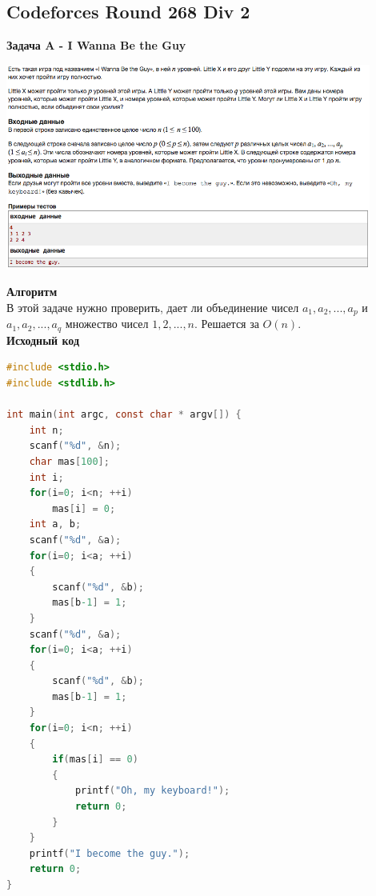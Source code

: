 \documentclass[a4paper,12pt]{article}
\begin{document}
%
%

\newpage
\subsection{Codeforces Round 268 Div 2}

\textbf{{\large Задача A - I Wanna Be the Guy}} \\
\begin{center}
\includegraphics[width=0.9\textwidth]{C_268/C_268_A.png}\\ [1cm]
\end{center}
\textbf{{\large Алгоритм}} \\
В этой задаче нужно проверить, дает ли объединение чисел $a_1, a_2, ... , a_p$ и $a_1, a_2, ... , a_q$ множество чисел $1, 2, ... , n$. Решается за $O(n)$.\\

\textbf{{\large Исходный код}}
\begin{lstlisting}[language=C]
#include <stdio.h>
#include <stdlib.h>

int main(int argc, const char * argv[]) {
    int n;
    scanf("%d", &n);
    char mas[100];
    int i;
    for(i=0; i<n; ++i)
        mas[i] = 0;
    int a, b;
    scanf("%d", &a);
    for(i=0; i<a; ++i)
    {
        scanf("%d", &b);
        mas[b-1] = 1;
    }
    scanf("%d", &a);
    for(i=0; i<a; ++i)
    {
        scanf("%d", &b);
        mas[b-1] = 1;
    }
    for(i=0; i<n; ++i)
    {
        if(mas[i] == 0)
        {
            printf("Oh, my keyboard!");
            return 0;
        }
    }
    printf("I become the guy.");
    return 0;
}
\end{lstlisting}
\end{document}
